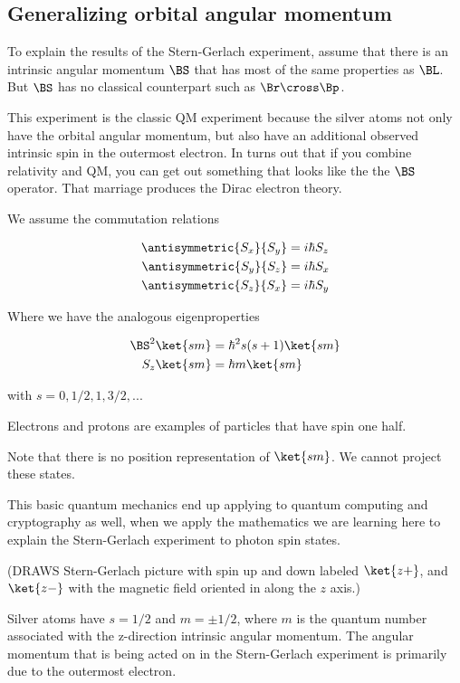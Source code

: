 \subsection{Generalizing orbital angular momentum}

To explain the results of the Stern-Gerlach experiment, assume that there is an intrinsic angular momentum $\BS$ that has most of the same properties as $\BL$.  But $\BS$ has no classical counterpart such as $\Br \cross \Bp$.

This experiment is the classic QM experiment because the silver atoms not only have the orbital angular momentum, but also have an additional observed intrinsic spin in the outermost electron.  In turns out that if you combine relativity and QM, you can get out something that looks like the the $\BS$ operator.  That marriage produces the Dirac electron theory.

We assume the commutation relations

\begin{align}\label{eqn:PHY356Foct19:2000}
\antisymmetric{S_x}{S_y} &= i \hbar S_z \\
\antisymmetric{S_y}{S_z} &= i \hbar S_x \\
\antisymmetric{S_z}{S_x} &= i \hbar S_y
\end{align}

Where we have the analogous eigenproperties

\begin{align}\label{eqn:PHY356Foct19:2001}
\BS^2 \ket{sm} &= \hbar^2 s(s+1) \ket{sm} \\
S_z \ket{sm} &= \hbar m \ket{sm}
\end{align}

with $s = 0, 1/2, 1, 3/2, ...$

Electrons and protons are examples of particles that have spin one half.

Note that there is no position representation of $\ket{sm}$.  We cannot project these states.

This basic quantum mechanics end up applying to quantum computing and cryptography as well, when we apply the mathematics we are learning here to explain the Stern-Gerlach experiment to photon spin states.

(DRAWS Stern-Gerlach picture with spin up and down labeled $\ket{z+}$, and $\ket{z-}$ with the magnetic field oriented in along the $z$ axis.)

Silver atoms have $s = 1/2$ and $m= \pm 1/2$, where $m$ is the quantum number associated with the z-direction intrinsic angular momentum.  The angular momentum that is being acted on in the Stern-Gerlach experiment is primarily due to the outermost electron.

